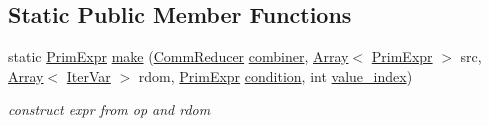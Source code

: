 \subsection*{Static Public Member Functions}
\begin{DoxyCompactItemize}
\item 
static \hyperlink{classtvm_1_1PrimExpr}{Prim\+Expr} \hyperlink{classtvm_1_1tir_1_1ReduceNode_a9cdfb176503a1b2a70d5bb1f452470a2}{make} (\hyperlink{classtvm_1_1tir_1_1CommReducer}{Comm\+Reducer} \hyperlink{classtvm_1_1tir_1_1ReduceNode_a5dcdd28aac37f4313ad18065bf824e11}{combiner}, \hyperlink{classtvm_1_1Array}{Array}$<$ \hyperlink{classtvm_1_1PrimExpr}{Prim\+Expr} $>$ src, \hyperlink{classtvm_1_1Array}{Array}$<$ \hyperlink{classtvm_1_1tir_1_1IterVar}{Iter\+Var} $>$ rdom, \hyperlink{classtvm_1_1PrimExpr}{Prim\+Expr} \hyperlink{classtvm_1_1tir_1_1ReduceNode_acd7c0d18b8b1cc78203479dfd52cd94c}{condition}, int \hyperlink{classtvm_1_1tir_1_1ReduceNode_a3e27c310483199b33784b1b98e3787af}{value\+\_\+index})
\begin{DoxyCompactList}\small\item\em construct expr from op and rdom \end{DoxyCompactList}\end{DoxyCompactItemize}
